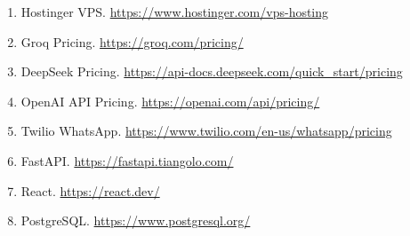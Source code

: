 \documentclass[12pt,oneside]{report}
\begin{document}
\begin{enumerate}[nosep]
    \item Hostinger VPS. \url{https://www.hostinger.com/vps-hosting}
    \item Groq Pricing. \url{https://groq.com/pricing/}
    \item DeepSeek Pricing. \url{https://api-docs.deepseek.com/quick_start/pricing}
    \item OpenAI API Pricing. \url{https://openai.com/api/pricing/}
    \item Twilio WhatsApp. \url{https://www.twilio.com/en-us/whatsapp/pricing}
    \item FastAPI. \url{https://fastapi.tiangolo.com/}
    \item React. \url{https://react.dev/}
    \item PostgreSQL. \url{https://www.postgresql.org/}
\end{enumerate}
\end{document}
